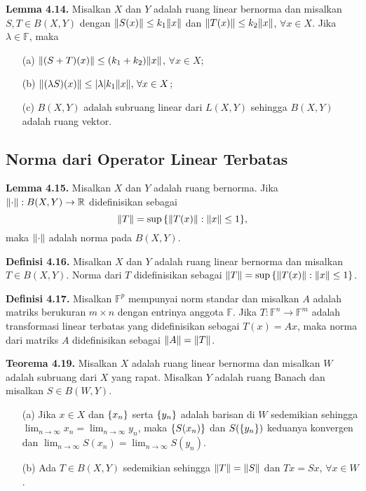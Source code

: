 \documentclass{article}
\newcommand{\Lim}{\lim_{n  \to \infty}}
\begin{document}
\begin{multicols}{2}
  \textbf{Lemma 4.14.} Misalkan \(X\) dan \(Y\) adalah ruang linear bernorma dan misalkan \(S,T\in B(X,Y)\) dengan \(\norm{S(x)} \leq k_1\norm{x}\) dan \(\norm{T(x)} \leq k_2\norm{x}\), \(\forall x \in X\). Jika \(\lambda \in \mathbb{F}\), maka
  \begin{itemize}
    \item[(a)] \(\norm{(S+T)(x)} \leq (k_1 + k_2)\norm{x}\), \(\forall x\in X\);
    \item[(b)] \(\norm{(\lambda S)(x)} \leq \abs{\lambda}k_1\norm{x}, \, \forall x \in X\);
    \item[(c)] \(B(X,Y)\) adalah subruang linear dari \(L(X,Y)\) sehingga \(B(X,Y)\) adalah ruang vektor.
  \end{itemize}
  \vspace{-1em}
  \subsection*{Norma dari Operator Linear Terbatas}
  \vspace{-1em}
  \textbf{Lemma 4.15.} Misalkan \(X\) dan \(Y\) adalah ruang bernorma. Jika \(\norm{\cdot}: B(X,Y) \to \mathbb{R}\) didefinisikan sebagai
  \begin{equation*}
    \norm{T} = \sup\qty{\norm{T(x)}:\norm{x} \leq 1},
  \end{equation*}
  maka \(\norm{\cdot}\) adalah norma pada \(B(X,Y)\).

  \textbf{Definisi 4.16.} Misalkan \(X\) dan \(Y\) adalah ruang linear bernorma dan misalkan \(T \in B(X,Y)\). Norma dari \(T\) didefinisikan sebagai \(\norm{T} = \sup\qty{\norm{T(x)}:\norm{x} \leq 1}\).

  \textbf{Definisi 4.17.} Misalkan \(\mathbb{F}^p\) mempunyai norm standar dan misalkan \(A\) adalah matriks berukuran \(m \times n\) dengan entrinya anggota \(\mathbb{F}\). Jika \(T : \mathbb{F}^n \to \mathbb{F}^m\) adalah transformasi linear terbatas yang didefinisikan sebagai \(T(x) = Ax\), maka norma dari matriks \(A\) didefinisikan sebagai \(\norm{A} = \norm{T}\).

  \textbf{Teorema 4.19.} Misalkan \(X\) adalah ruang linear bernorma dan misalkan \(W\) adalah subruang dari \(X\) yang rapat. Misalkan \(Y\) adalah ruang Banach dan misalkan \(S \in B(W,Y)\).
  \begin{itemize}
    \item[(a)] Jika \(x \in X\) dan \(\qty{x_n}\) serta \(\qty{y_n}\) adalah barisan di \(W\) sedemikian sehingga \(\displaystyle \lim_{n  \to \infty} x_n = \Lim y_n\), maka \(\qty{S(x_n)}\) dan \(S(\qty{y_n})\) keduanya konvergen dan \(\displaystyle \Lim S(x_n) = \Lim S(y_n)\).
    \item[(b)] Ada \(T \in B(X,Y)\) sedemikian sehingga \(\norm{T} = \norm{S}\) dan \(Tx = Sx,\, \forall x\in W\).
  \end{itemize}


\end{multicols}
\end{document}
